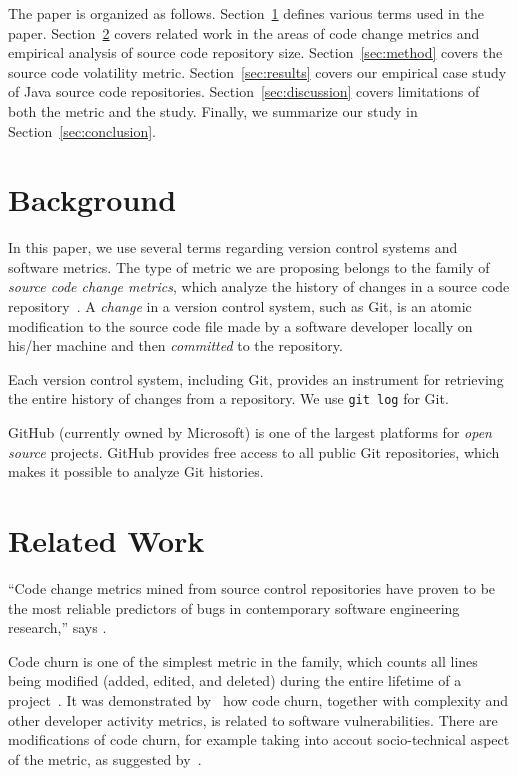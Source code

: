 \documentclass[sigconf]{acmart}
\begin{document}
The paper is organized as follows.
Section~\ref{sec:background} defines various terms used in the paper.
Section~\ref{sec:related} covers related work in the areas of code change metrics
and empirical analysis of source code repository size.
Section~\ref{sec:method} covers the source code volatility metric.
Section~\ref{sec:results} covers our empirical case study of \thetotalrepos{} Java source code repositories.
Section~\ref{sec:discussion} covers limitations of both the metric and the study.
Finally, we summarize our study in Section~\ref{sec:conclusion}.

\section{Background}
\label{sec:background}

In this paper, we use several terms regarding version control systems and
software metrics. The type of metric we are proposing belongs to the family
of \emph{source code change metrics}, which analyze the history
of changes in a source code repository~\citep{fentonsoftware,choudhary2018}.
A \emph{change} in a version control system, such as Git, is an atomic
modification to the source code file made by a software developer locally
on his/her machine and then \emph{committed} to the repository.

Each version control system, including Git, provides an instrument for
retrieving the entire history of changes from a repository. We use
\texttt{git log} for Git.

GitHub\texttrademark{} (currently owned by Microsoft\texttrademark{}) is
one of the largest platforms for \emph{open source} projects.
GitHub provides free access to all public Git repositories, which makes it possible
to analyze Git histories.

\section{Related Work}
\label{sec:related}

``Code change metrics mined from source control repositories have
proven to be the most reliable predictors of bugs in
contemporary software engineering research,'' says \citet{muthukumaran2015}.

Code churn is one of the simplest metric in the family, which counts
all lines being modified (added, edited, and deleted) during
the entire lifetime of a project~\citep{munson1998}. It was demonstrated
by~\citet{shin2010} how code churn, together with complexity and other
developer activity metrics, is related to software vulnerabilities. There
are modifications of code churn, for example taking into accout socio-technical
aspect of the metric, as suggested by~\citet{meneely2012}.
\end{document}
